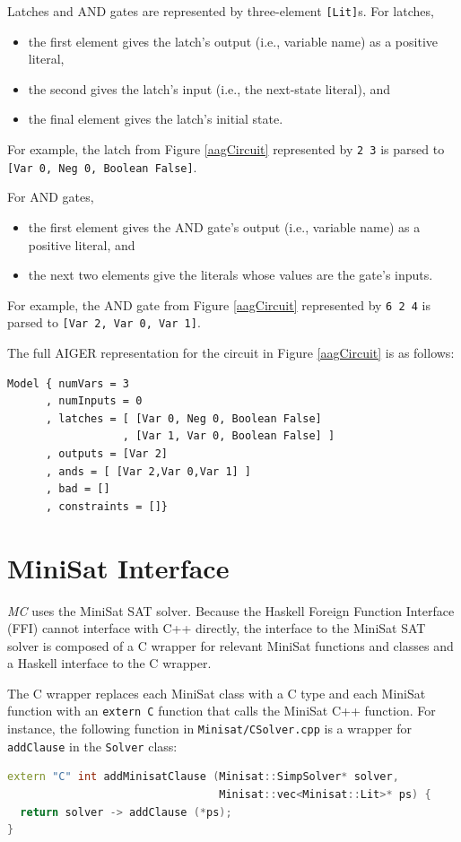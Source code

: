 \documentclass[12pt,a4paper,twoside,openright]{report}
\begin{document}
{{Latches and AND gates are represented by three-element \verb,[Lit],s. For latches,
\begin{itemize}
\item the first element gives the latch's output (i.e., variable name)
as a positive literal,
\item the second gives the latch's input (i.e., the next-state literal), and
\item the final element gives the latch's initial state.
\end{itemize}
For example, the latch from Figure \ref{aagCircuit} represented by \verb,2 3, is parsed
to \verb.[Var 0, Neg 0, Boolean False]..

For AND gates,
\begin{itemize}
\item the first element gives the AND gate's output (i.e., variable name)
as a positive literal, and
\item the next two elements give the literals whose values are the gate's inputs.
\end{itemize}
For example, the AND gate from Figure \ref{aagCircuit} represented by \verb,6 2 4, is
parsed to \verb.[Var 2, Var 0, Var 1]..

The full AIGER representation for the circuit in Figure \ref{aagCircuit} is
as follows:
\begin{lstlisting}
Model { numVars = 3
      , numInputs = 0
      , latches = [ [Var 0, Neg 0, Boolean False]
                  , [Var 1, Var 0, Boolean False] ]
      , outputs = [Var 2]
      , ands = [ [Var 2,Var 0,Var 1] ]
      , bad = []
      , constraints = []}
\end{lstlisting}

\section{MiniSat Interface}
\label{impl:minisat}

\emph{MC} uses the MiniSat SAT solver.
Because the Haskell Foreign Function Interface (FFI) cannot interface with C++ directly,
the interface to the MiniSat SAT solver is composed of a C wrapper for relevant
MiniSat functions and classes and a Haskell interface to the C wrapper.

The C wrapper replaces each MiniSat class with a C type and each MiniSat function with
an \verb,extern C, function that calls the MiniSat C++ function.
For instance, the following function
in \verb,Minisat/CSolver.cpp, is a wrapper for \verb,addClause, in the \verb,Solver,
class:
\begin{lstlisting}[language = C++]
extern "C" int addMinisatClause (Minisat::SimpSolver* solver,
                                 Minisat::vec<Minisat::Lit>* ps) {
  return solver -> addClause (*ps);
}
\end{lstlisting}

}}
\end{document}
